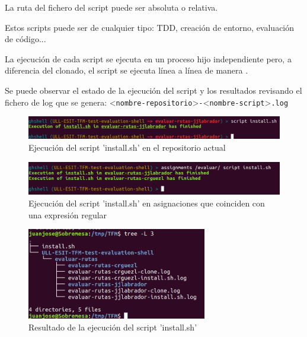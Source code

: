 	La ruta del fichero del script puede ser absoluta o relativa. 
\bigskip
	
	Estos scripts puede ser de cualquier tipo: TDD, creación de entorno, evaluación de código...
\bigskip

	La ejecución de cada script se ejecuta en un proceso hijo independiente pero, a diferencia del clonado, el script se ejecuta línea a línea de manera \ceit{\ref{apend1:sincrona}}. 
\bigskip
	
	Se puede observar el estado de la ejecución del script y los resultados revisando el fichero de log que se genera: \textless \verb|nombre-repositorio|\textgreater \verb|-|\textless \verb|nombre-script|\textgreater \verb|.log|
    	
    	\begin{figure}[H]
		\begin{center}
		\includegraphics[width=1\textwidth]{images/ghshell7-3}
		\caption{Ejecución del script 'install.sh' en el repositorio actual}
		\label{fig:ghshell7-3}
		\end{center}
		\end{figure}
		
        \begin{figure}[H]
		\begin{center}
		\includegraphics[width=1\textwidth]{images/ghshell7-1}
		\caption{Ejecución del script 'install.sh' en asignaciones que coinciden con una expresión regular}
		\label{fig:ghshell7-1}
		\end{center}
		\end{figure}	
		
		\begin{figure}[H]
		\begin{center}
		\includegraphics[width=0.7\textwidth]{images/ghshell7-2}
		\caption{Resultado de la ejecución del script 'install.sh'}
		\label{fig:ghshell7-2}
		\end{center}
		\end{figure}
		
